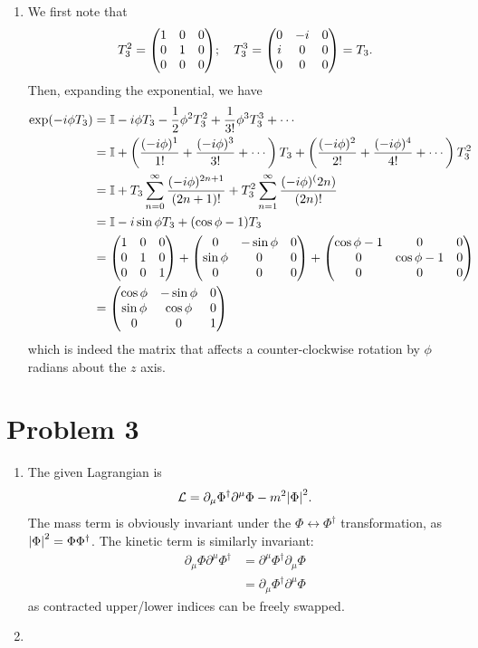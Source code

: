 \documentclass[12pt]{article}
\begin{document}
\begin{enumerate}[label=(\alph*)]
    \item We first note that
    \[ T_3^2 = \mqty(1&0&0\\0&1&0\\0&0&0); \quad T_3^3 = \mqty(0&-i&0\\i&0&0\\0&0&0) = T_3. \]
    Then, expanding the exponential, we have
    \begin{align*}
        \exp(-i\phi T_3) &= \mathbb{I} - i\phi T_3 - \frac{1}{2}\phi^2 T_3^2 + \frac{1}{3!}\phi^3 T_3^3 + \cdots \\
        &= \mathbb{I} + \left(\frac{(-i\phi)^1}{1!} + \frac{(-i\phi)^3}{3!} + \cdots\right)T_3 + \left(\frac{(-i\phi)^2}{2!} + \frac{(-i\phi)^4}{4!} + \cdots\right)T_3^2 \\
        &= \mathbb{I} + T_3\sum_{n=0}^{\infty}\frac{(-i\phi)^{2n+1}}{(2n+1)!} + T_3^2\sum_{n=1}^{\infty}\frac{(-i\phi)^(2n)}{(2n)!} \\
        &= \mathbb{I} - i\sin\phi T_3 + (\cos\phi - 1)T_3 \\
        &= \mqty(1&0&0\\0&1&0\\0&0&1) + \mqty(0&-\sin\phi&0\\\sin\phi&0&0\\0&0&0) + \mqty(\cos\phi-1&0&0\\0&\cos\phi-1&0\\0&0&0) \\
        &= \mqty(\cos\phi&-\sin\phi&0\\\sin\phi&\cos\phi&0\\0&0&1)
    \end{align*}
    which is indeed the matrix that affects a counter-clockwise rotation by $\phi$ radians about the $z$ axis.
\end{enumerate}

\section*{Problem 3}
\begin{enumerate}[label=(\alph*)]
    \item The given Lagrangian is
    \[ \mathcal{L} = \partial_\mu\Phi^\dag\partial^\mu\Phi - m^2\abs{\Phi}^2. \]
    The mass term is obviously invariant under the $\Phi \leftrightarrow \Phi^\dag$ transformation, as $\abs{\Phi}^2 = \Phi\Phi^\dag$. The kinetic term is similarly invariant:
    \begin{align*}
        \partial_\mu\Phi\partial^\mu\Phi^\dag &= \partial^\mu\Phi^\dag\partial_\mu\Phi \\
        &= \partial_\mu\Phi^\dag\partial^\mu\Phi
    \end{align*}
    as contracted upper/lower indices can be freely swapped.

    \item
\end{enumerate}
\end{document}
